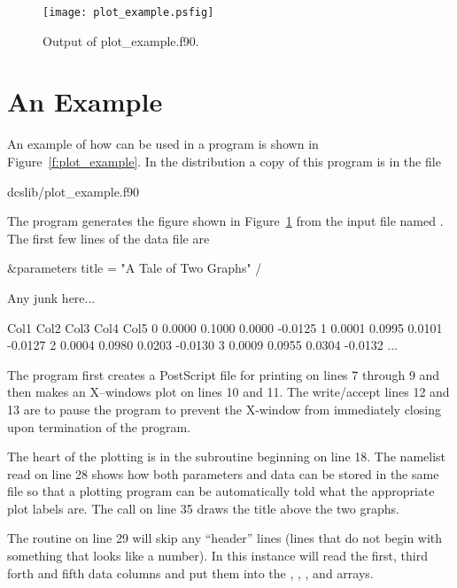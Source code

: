 \begin{figure}
\centering
\texttt{[image: plot\_example.psfig]}
\caption{Output of plot\_example.f90.}
\label{f:plot_out}
\end{figure}

\section{An Example}
\label{s:plot_example}

An example of how \quickplot can be used in a program is shown in
Figure~\ref{f:plot_example}. In the \bmad distribution a copy of this
program is in the file
\begin{example}
  dcslib/plot_example.f90
\end{example}
The  program generates the figure shown in
Figure~\ref{f:plot_out} from the input file named . The
first few lines of the data file are
\begin{example}
  \&parameters
    title = "A Tale of Two Graphs"
  /
 
  Any junk here...
 
  Col1      Col2      Col3      Col4      Col5
     0    0.0000    0.1000    0.0000   -0.0125
     1    0.0001    0.0995    0.0101   -0.0127
     2    0.0004    0.0980    0.0203   -0.0130
     3    0.0009    0.0955    0.0304   -0.0132
     ...
\end{example}

The program first creates a PostScript file for printing on lines 7
through 9 and then makes an X--windows plot on lines 10 and 11. The
write/accept lines 12 and 13 are to pause the program to prevent the
X-window from immediately closing upon termination of the program.

The heart of the plotting is in the subroutine  beginning
on line 18. The namelist read on line 28 shows how both parameters and
data can be stored in the same file so that a plotting program can be
automatically told what the appropriate plot labels are. The
 call on line 35 draws the title above the two graphs.

The  routine on line 29 will skip any ``header''
lines (lines that do not begin with something that looks like a
number). In this instance  will read the first, third
forth and fifth data columns and put them into the , ,
, and  arrays.

